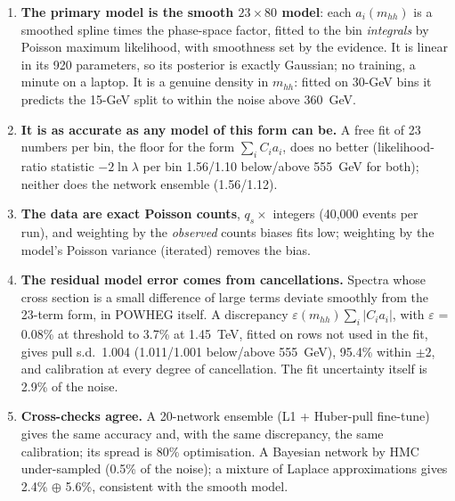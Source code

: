 \begin{keyidea}
\begin{enumerate}[leftmargin=1.3em]
  \item \textbf{The primary model is the smooth $23\times80$ model}: each $a_i(m_{hh})$ is a
    smoothed spline times the phase-space factor, fitted to the bin \emph{integrals} by Poisson
    maximum likelihood, with smoothness set by the evidence. It is linear in its 920
    parameters, so its posterior is exactly Gaussian; no training, a minute on a laptop. It is a
    genuine density in $m_{hh}$: fitted on 30-GeV bins it predicts the 15-GeV split to within the
    noise above 360~GeV.
  \item \textbf{It is as accurate as any model of this form can be.} A free fit of 23 numbers
    per bin, the floor for the form $\sum_i C_i a_i$, does no better (likelihood-ratio statistic $-2\ln\lambda$ per bin 1.56/1.10
    below/above 555~GeV for both); neither does the network ensemble (1.56/1.12).
  \item \textbf{The data are exact Poisson counts}, $q_s\times$ integers (40,000 events per run),
    and weighting by the \emph{observed} counts biases fits low; weighting by the model's
    Poisson variance (iterated) removes the bias.
  \item \textbf{The residual model error comes from cancellations.} Spectra whose cross section is
    a small difference of large terms deviate smoothly from the 23-term form, in POWHEG itself. A
    discrepancy $\varepsilon(m_{hh})\sum_i|C_ia_i|$, with $\varepsilon$ = 0.08\% at threshold to
    3.7\% at 1.45~TeV, fitted on rows not used in the fit, gives pull s.d.\ 1.004 (1.011/1.001
    below/above 555~GeV), 95.4\% within $\pm2$, and calibration at every degree of cancellation.
    The fit uncertainty itself is 2.9\% of the noise.
  \item \textbf{Cross-checks agree.} A 20-network ensemble (L1 + Huber-pull fine-tune) gives the
    same accuracy and, with the same discrepancy, the same calibration; its spread is 80\%
    optimisation. A Bayesian network by HMC under-sampled (0.5\% of the noise); a mixture of
    Laplace approximations gives 2.4\% $\oplus$ 5.6\%, consistent with the smooth model.
\end{enumerate}
\end{keyidea}


